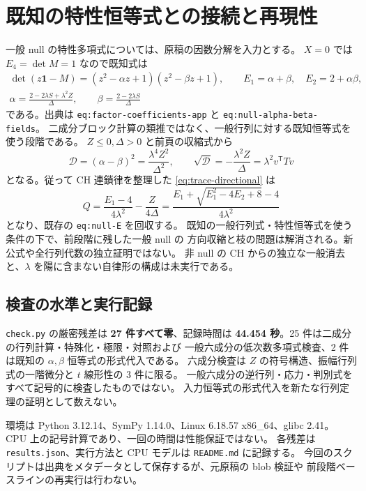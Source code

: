 \documentclass[11pt,a4paper]{article}
\newcommand{\Id}{\mathbf{1}}
\begin{document}
\newpage
\section{既知の特性恒等式との接続と再現性}
一般 null の特性多項式については、原稿の因数分解を入力とする。
$X=0$ では $E_4=\det M=1$ なので既知式は
\begin{equation}\label{eq:known-factor}
\begin{gathered}
\det(z\Id-M)=(z^2-\alpha z+1)(z^2-\beta z+1),\qquad
E_1=\alpha+\beta,\quad E_2=2+\alpha\beta,\\
\alpha=\frac{2-2\lambda S+\lambda^2Z}{\Delta},\qquad
\beta=\frac{2-2\lambda S}{\Delta}
\end{gathered}
\end{equation}
である。出典は \texttt{eq:factor-coefficients-app} と
\texttt{eq:null-alpha-beta-fields}。
二成分ブロック計算の類推ではなく、一般行列に対する既知恒等式を使う段階である。
$Z\leq0,\Delta>0$ と前頁の収縮式から
\begin{equation}\label{eq:general-discriminant}
\mathcal D=(\alpha-\beta)^2=\frac{\lambda^4Z^2}{\Delta^2},\qquad
\sqrt{\mathcal D}=-\frac{\lambda^2Z}{\Delta}=\lambda^2v^{\mathsf T}Tv
\end{equation}
となる。従って CH 連鎖律を整理した \eqref{eq:trace-directional} は
\begin{equation}\label{eq:bridge}
\boxed{Q=\frac{E_1-4}{4\lambda^2}-\frac{Z}{4\Delta}
=\frac{E_1+\sqrt{E_1^2-4E_2+8}-4}{4\lambda^2}}
\end{equation}
となり、既存の \texttt{eq:null-E} を回収する。
既知の一般行列式・特性恒等式を使う条件の下で、前段階に残した一般 null の
方向収縮と枝の問題は解消される。新公式や全行列代数の独立証明ではない。
非 null の CH からの独立な一般消去と、$\lambda$ を陽に含まない自律形の構成は未実行である。

\subsection*{検査の水準と実行記録}
\texttt{check.py} の厳密残差は \textbf{27 件すべて零}、記録時間は
\textbf{44.454 秒}。25 件は二成分の行列計算・特殊化・極限・対照および
一般六成分の低次数多項式検査、2 件は既知の $\alpha,\beta$ 恒等式の形式代入である。
六成分検査は $Z$ の符号構造、振幅行列式の一階微分と $t$ 線形性の 3 件に限る。
一般六成分の逆行列・応力・判別式をすべて記号的に検査したものではない。
入力恒等式の形式代入を新たな行列定理の証明として数えない。

環境は Python 3.12.14、SymPy 1.14.0、Linux 6.18.57 x86\_64、glibc 2.41。
CPU 上の記号計算であり、一回の時間は性能保証ではない。
各残差は \texttt{results.json}、実行方法と CPU モデルは \texttt{README.md} に記録する。
今回のスクリプトは出典をメタデータとして保存するが、元原稿の blob 検証や
前段階ベースラインの再実行は行わない。
\end{document}
